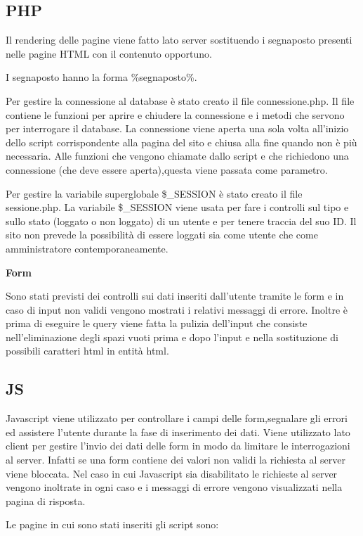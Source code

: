 \documentclass[a4paper]{article}
\begin{document}
\subsection{PHP}
Il rendering delle pagine viene fatto lato server sostituendo i segnaposto presenti nelle pagine HTML
con il contenuto opportuno.

I segnaposto hanno la forma \%segnaposto\%.

Per gestire la connessione al database \`e stato creato il file connessione.php.
Il file contiene le funzioni per aprire e chiudere la connessione e i metodi che servono per interrogare il database.
La connessione viene aperta una sola volta all'inizio dello script corrispondente alla pagina del sito e chiusa alla fine quando non \`e pi\`u necessaria.
Alle funzioni che vengono chiamate dallo script e che richiedono una connessione (che deve essere aperta),questa viene passata come parametro.

Per gestire la variabile superglobale \$\_SESSION \`e stato creato il file sessione.php.
La variabile \$\_SESSION viene usata per fare i controlli sul tipo e sullo stato (loggato o non loggato) di un utente e per tenere traccia del suo ID.
Il sito non prevede la possibilit\`a di essere loggati sia come utente che come amministratore contemporaneamente.

\textbf{Form}

Sono stati previsti dei controlli sui dati inseriti dall'utente tramite le form e in caso di input non validi vengono
mostrati i relativi messaggi di errore.
Inoltre \`e prima di eseguire le query viene fatta la pulizia dell'input che consiste nell'eliminazione degli spazi vuoti
prima e dopo l'input e nella sostituzione di possibili caratteri html in entit\`a html.

\subsection{JS}
Javascript viene utilizzato per controllare i campi delle form,segnalare gli errori ed assistere l'utente durante la fase di inserimento dei dati.
Viene utilizzato lato client per gestire l'invio dei dati delle form in modo da limitare le interrogazioni al server.
Infatti se una form contiene dei valori non validi la richiesta al server viene bloccata.
Nel caso in cui Javascript sia disabilitato le richieste al server vengono inoltrate in ogni caso e i messaggi di errore vengono visualizzati nella pagina di risposta.

Le pagine in cui sono stati inseriti gli script sono:
\end{document}
